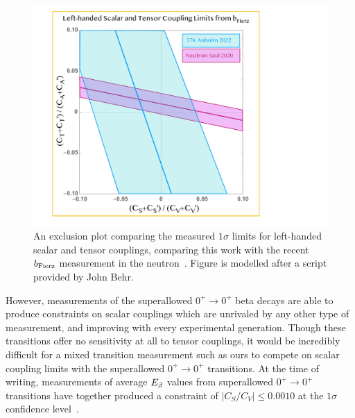 \note{}
\begin{figure}[h!t!b!]
	\centering
	\includegraphics[width=.999\linewidth]{Figures/ScalarTensorLimits.pdf}
	\caption[An exclusion plot for left-handed scalar and tensor couplings comparing this work with the recent $\bFierz$ measurement in the neutron]{An exclusion plot comparing the measured $1\sigma$ limits for left-handed scalar and tensor couplings, comparing this work with the recent $\bFierz$ measurement in the neutron~\cite{Saul2020}.  Figure is modelled after a script provided by John Behr.  
	}
	\label{fig:exclusionplotfromjohn}
\end{figure}

However, measurements of the superallowed $0^+ \rightarrow 0^+$ beta decays are able to produce constraints on scalar couplings which are unrivaled by any other type of measurement, and improving with every experimental generation.  Though these transitions offer no sensitivity at all to tensor couplings, it would be incredibly difficult for a mixed transition measurement such as ours to compete on scalar coupling limits with the superallowed $0^+ \rightarrow 0^+$ transitions.  
At the time of writing, measurements of average $E_{\beta}$ values from superallowed $0^+ \rightarrow 0^+$ transitions have together produced a constraint of \mbox{$\left| C_S / C_V \right| \leq 0.0010$} at the $1\sigma$ confidence level~\cite{HardyTownerSuperallowed2020}.

